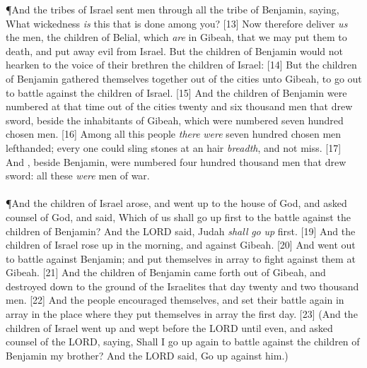 \P \textcolor[cmyk]{0.99998,1,0,0}{And the tribes of Israel sent men through all the tribe of Benjamin, saying, What wickedness \emph{is} this that is done among you?}
[13] \textcolor[cmyk]{0.99998,1,0,0}{Now therefore deliver \emph{us} the men, the children of Belial, which \emph{are} in Gibeah, that we may put them to death, and put away evil from Israel. But the children of Benjamin would not hearken to the voice of their brethren the children of Israel:}
[14] \textcolor[cmyk]{0.99998,1,0,0}{But the children of Benjamin gathered themselves together out of the cities unto Gibeah, to go out to battle against the children of Israel.}
[15] \textcolor[cmyk]{0.99998,1,0,0}{And the children of Benjamin were numbered at that time out of the cities twenty and six thousand men that drew sword, beside the inhabitants of Gibeah, which were numbered seven hundred chosen men.}
[16] \textcolor[cmyk]{0.99998,1,0,0}{Among all this people \emph{there} \emph{were} seven hundred chosen men lefthanded; every one could sling stones at an hair \emph{breadth}, and not miss.}
[17] \textcolor[cmyk]{0.99998,1,0,0}{And , beside Benjamin, were numbered four hundred thousand men that drew sword: all these \emph{were} men of war.}\\
\\
\P \textcolor[cmyk]{0.99998,1,0,0}{And the children of Israel arose, and went up to the house of God, and asked counsel of God, and said, Which of us shall go up first to the battle against the children of Benjamin? And the LORD said, Judah \emph{shall} \emph{go} \emph{up} first.}
[19] \textcolor[cmyk]{0.99998,1,0,0}{And the children of Israel rose up in the morning, and  against Gibeah.}
[20] \textcolor[cmyk]{0.99998,1,0,0}{And  went out to battle against Benjamin; and  put themselves in array to fight against them at Gibeah.}
[21] \textcolor[cmyk]{0.99998,1,0,0}{And the children of Benjamin came forth out of Gibeah, and destroyed down to the ground of the Israelites that day twenty and two thousand men.}
[22] \textcolor[cmyk]{0.99998,1,0,0}{And the people  encouraged themselves, and set their battle again in array in the place where they put themselves in array the first day.}
[23] \textcolor[cmyk]{0.99998,1,0,0}{(And the children of Israel went up and wept before the LORD until even, and asked counsel of the LORD, saying, Shall I go up again to battle against the children of Benjamin my brother? And the LORD said, Go up against him.)}
